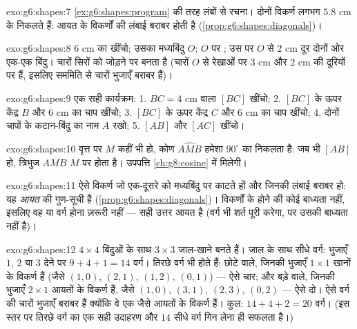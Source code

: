 \begin{solution}{exo:g6:shapes:7}
\cref{ex:g6:shapes:program} की तरह लंबों से रचना।
दोनों विकर्ण लगभग $5.8$ cm के निकलते हैं: आयत के विकर्णों की
लंबाई बराबर होती है (\cref{prop:g6:shapes:diagonals})।
\end{solution}

\begin{solution}{exo:g6:shapes:8}
$6$ cm का  खींचो; उसका मध्यबिंदु $O$; $O$ पर ;
उस पर $O$ से $2$ cm दूर दोनों ओर एक-एक बिंदु। चारों सिरों को
जोड़ने पर  बनता है (चारों  $O$ से  रेखाओं पर
$3$ cm और $2$ cm की दूरियों पर हैं, इसलिए सममिति से चारों भुजाएँ
बराबर हैं)।
\end{solution}

\begin{solution}{exo:g6:shapes:9}
एक सही कार्यक्रम:
1. $BC = 4$ cm वाला  $[BC]$ खींचो;
2. $[BC]$ के ऊपर केंद्र $B$ और  $6$ cm का चाप खींचो;
3. $[BC]$ के ऊपर केंद्र $C$ और  $6$ cm का चाप खींचो;
4. दोनों चापों के कटान-बिंदु का नाम $A$ रखो;
5.  $[AB]$ और $[AC]$ खींचो।
\end{solution}

\begin{solution}{exo:g6:shapes:10}
वृत्त पर $M$ कहीं भी हो, कोण $\widehat{AMB}$ हमेशा
$90^\circ$ का निकलता है: जब भी $[AB]$  हो, त्रिभुज $AMB$
$M$ पर  होता है। उपपत्ति \cref{ch:g8:cosine} में मिलेगी।
\end{solution}

\begin{solution}{exo:g6:shapes:11}
ऐसे विकर्ण जो एक-दूसरे को मध्यबिंदु पर काटते हों और जिनकी लंबाई
बराबर हो: यह \emph{आयत} की गुण-सूची है
(\cref{prop:g6:shapes:diagonals})। विकर्णों के  होने की कोई
बाध्यता नहीं, इसलिए वह  या वर्ग होना ज़रूरी नहीं ---
सही उत्तर आयत है (वर्ग भी शर्त पूरी करेगा, पर उसकी बाध्यता नहीं
है)।
\end{solution}

\begin{solution}{exo:g6:shapes:12}
$4 \times 4$ बिंदुओं के साथ $3 \times 3$ जाल-खाने बनते हैं।
जाल के साथ सीधे वर्ग: भुजाएँ $1$, $2$ या $3$ देने पर
$9 + 4 + 1 = 14$ वर्ग। तिरछे वर्ग भी होते हैं: छोटे वाले, जिनकी
भुजाएँ $1 \times 1$ खानों के विकर्ण हैं (जैसे $(1,0)$, $(2,1)$,
$(1,2)$, $(0,1)$) --- ऐसे चार; और बड़े वाले, जिनकी भुजाएँ
$2 \times 1$ आयतों के विकर्ण हैं, जैसे $(1,0)$, $(3,1)$,
$(2,3)$, $(0,2)$ --- ऐसे दो। ऐसे वर्ग की चारों भुजाएँ बराबर हैं
क्योंकि वे एक जैसे आयतों के विकर्ण हैं। कुल:
$14 + 4 + 2 = 20$ वर्ग। (इस स्तर पर तिरछे वर्ग का एक सही
उदाहरण और $14$ सीधे वर्ग गिन लेना ही सफलता है।)
\end{solution}

